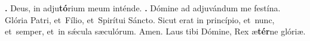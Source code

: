 
\textbf{\Vbar.} Deus, in adju\textbf{tó}rium meum inténde. 
\textbf{\Rbar.} Dómine ad adjuvándum me festína.
Glória Patri, et~Fílio, et~Spirítui Sáncto.
Sicut erat in princípio, et~nunc, et~semper, et~in s\'{\ae}cula sæculórum. Amen.
Laus tibi Dómine, Rex æ\textbf{tér}ne glóriæ.

